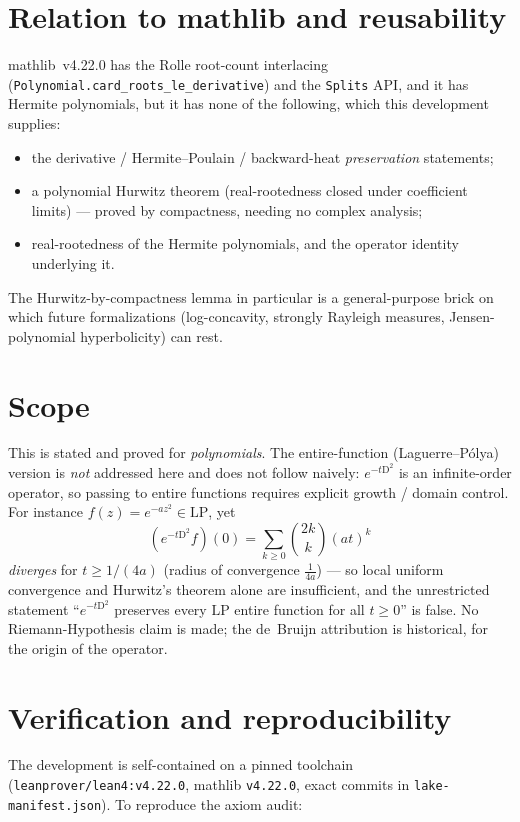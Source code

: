 \documentclass[11pt]{article}
\theoremstyle{definition}
\theoremstyle{remark}
\newcommand{\D}{\mathrm{D}}
\newcommand{\LP}{\mathrm{LP}}
\begin{document}
\section{Relation to mathlib and reusability}

mathlib~v4.22.0 has the Rolle root-count interlacing
(\texttt{Polynomial.card\_roots\_le\_derivative}) and the \texttt{Splits} API, and it has Hermite
polynomials, but it has none of the following, which this development supplies:
\begin{itemize}
  \item the derivative / Hermite--Poulain / backward-heat \emph{preservation} statements;
  \item a polynomial Hurwitz theorem (real-rootedness closed under coefficient limits) --- proved by
  compactness, needing no complex analysis;
  \item real-rootedness of the Hermite polynomials, and the operator identity underlying it.
\end{itemize}
The Hurwitz-by-compactness lemma in particular is a general-purpose brick on which future
formalizations (log-concavity, strongly Rayleigh measures, Jensen-polynomial hyperbolicity) can rest.

\section{Scope}\label{sec:distance}

This is stated and proved for \emph{polynomials}. The entire-function (Laguerre--P\'olya) version is
\emph{not} addressed here and does not follow naively: $e^{-t\D^2}$ is an infinite-order operator, so
passing to entire functions requires explicit growth / domain control. For instance $f(z)=e^{-az^2}\in
\LP$, yet
\[
  (e^{-t\D^2}f)(0) = \sum_{k\ge0}\binom{2k}{k}(at)^k
\]
\emph{diverges} for $t \ge 1/(4a)$ (radius of convergence $\tfrac1{4a}$) --- so local uniform
convergence and Hurwitz's theorem alone are insufficient, and the unrestricted statement
``$e^{-t\D^2}$ preserves every $\LP$ entire function for all $t \ge 0$'' is false. No
Riemann-Hypothesis claim is made; the de~Bruijn attribution is historical, for the origin of the
operator.

\section{Verification and reproducibility}\label{sec:verify}

The development is self-contained on a pinned toolchain (\texttt{leanprover/lean4:v4.22.0}, mathlib
\texttt{v4.22.0}, exact commits in \texttt{lake-manifest.json}). To reproduce the axiom audit:
\end{document}
